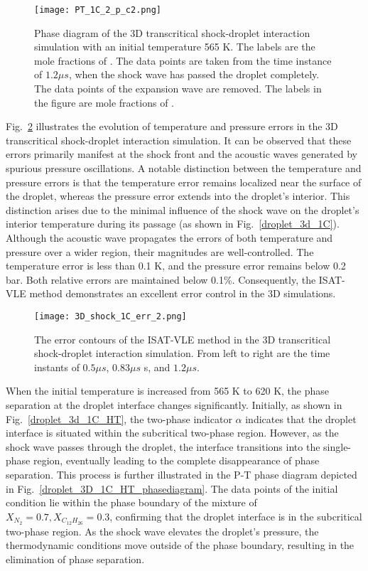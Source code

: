 \begin{figure}[htbp]
	\centering
	\texttt{[image: PT\_1C\_2\_p\_c2.png]}
	\caption{Phase diagram of the 3D transcritical shock-droplet interaction simulation with an initial temperature 565 K. The labels are the mole fractions of . The data points are taken from the time instance of $1.2\mu s$, when the shock wave has passed the droplet completely. The data points of the expansion wave are removed. The labels in the figure are mole fractions of .}
	\label{droplet_3D_1C_phasediagram}
\end{figure}

Fig.~\ref{SD_3D_err} illustrates the evolution of temperature and pressure errors in the 3D transcritical shock-droplet interaction simulation. It can be observed that these errors primarily manifest at the shock front and the acoustic waves generated by spurious pressure oscillations. A notable distinction between the temperature and pressure errors is that the temperature error remains localized near the surface of the droplet, whereas the pressure error extends into the droplet's interior. This distinction arises due to the minimal influence of the shock wave on the droplet's interior temperature during its passage (as shown in Fig.~\ref{droplet_3d_1C}). Although the acoustic wave propagates the errors of both temperature and pressure over a wider region, their magnitudes are well-controlled. The temperature error is less than 0.1 K, and the pressure error remains below 0.2 bar. Both relative errors are maintained below 0.1\%. Consequently, the ISAT-VLE method demonstrates an excellent error control in the 3D simulations.

\begin{figure}[htbp]
	\centering
	\texttt{[image: 3D\_shock\_1C\_err\_2.png]}
	\caption{The error contours of the ISAT-VLE method in the 3D transcritical shock-droplet interaction simulation. From left to right are the time instants of $0.5\mu s$, $0.83\mu s$ s, and $1.2\mu s$. }
	\label{SD_3D_err}
\end{figure}

When the initial temperature is increased from 565 K to 620 K, the phase separation at the droplet interface changes significantly. Initially, as shown in Fig.~\ref{droplet_3d_1C_HT}, the two-phase indicator $\alpha$ indicates that the droplet interface is situated within the subcritical two-phase region. However, as the shock wave passes through the droplet, the interface transitions into the single-phase region, eventually leading to the complete disappearance of phase separation. This process is further illustrated in the P-T phase diagram depicted in Fig.~\ref{droplet_3D_1C_HT_phasediagram}. The data points of the initial condition lie within the phase boundary of the mixture of $X_{N_2}=0.7, X_{C_{12}H_{26}}=0.3$, confirming that the droplet interface is in the subcritical two-phase region. As the shock wave elevates the droplet's pressure, the thermodynamic conditions move outside of the phase boundary, resulting in the elimination of phase separation.

